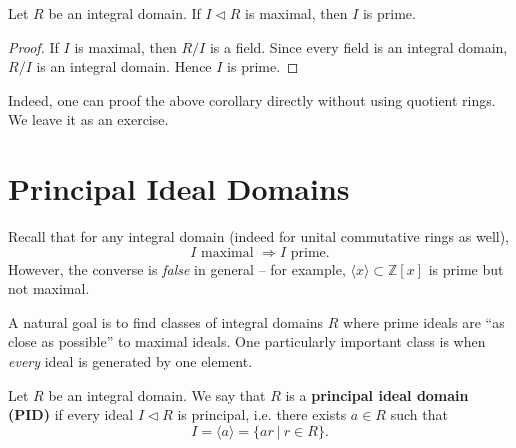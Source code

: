 \begin{corollary}
Let $R$ be an integral domain. If $I \triangleleft R$ is maximal, then $I$ is prime.
\end{corollary}
\begin{proof}
If $I$ is maximal, then $R/I$ is a field. Since every field is an integral domain, $R/I$ is an integral domain.  
Hence $I$ is prime.
\end{proof}
Indeed, one can proof the above corollary directly without using quotient rings. We leave it as an exercise.


\section{Principal Ideal Domains}

Recall that for any integral domain (indeed for unital commutative rings as well),
\[
I \text{ maximal } \Longrightarrow I \text{ prime}.
\]
However, the converse is \emph{false} in general -- for example, $\langle x\rangle \subset \mathbb{Z}[x]$ is prime but not maximal.

\medskip
A natural goal is to find classes of integral domains $R$ where prime ideals are ``as close as possible'' to maximal ideals. One particularly important class is when \emph{every} ideal is generated by one element.

\begin{definition}
Let $R$ be an integral domain. We say that $R$ is a \textbf{principal ideal domain (PID)} if every ideal
$I \triangleleft R$ is principal, i.e. there exists $a\in R$ such that
\[
I = \langle a \rangle = \{ar \ |\ r\in R\}.
\]
\end{definition}

